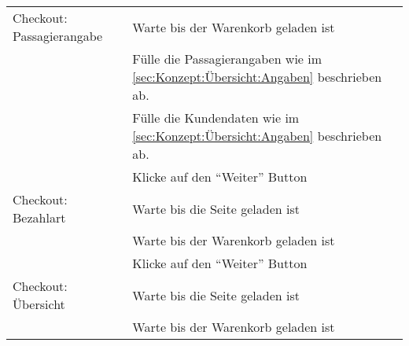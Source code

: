 \begin{table}[H]
\begin{tabularx}{0.9\textwidth}{ | l | X | }
		\multirow{1}{*}{Checkout: Passagierangabe} & Warte bis der Warenkorb geladen ist \\ \cline{2-2}
		& Fülle die Passagierangaben wie im \cref{sec:Konzept:Übersicht:Angaben} \nameref{sec:Konzept:Übersicht:Angaben} beschrieben ab. \\ \cline{2-2}
		& Fülle die Kundendaten wie im \cref{sec:Konzept:Übersicht:Angaben} \nameref{sec:Konzept:Übersicht:Angaben} beschrieben ab. \\ \cline{2-2}
		& Klicke auf den "`Weiter"' Button \\ \hline
		
		\multirow{1}{*}{Checkout: Bezahlart} & Warte bis die Seite geladen ist \\ \cline{2-2}
		& Warte bis der Warenkorb geladen ist \\ \cline{2-2}
		& Klicke auf den "`Weiter"' Button \\ \hline
		
		\multirow{1}{*}{Checkout: Übersicht} & Warte bis die Seite geladen ist \\ \cline{2-2}
		& Warte bis der Warenkorb geladen ist \\ \hline
	\end{tabularx} 
\end{table}


